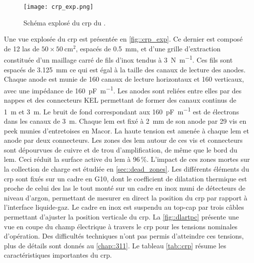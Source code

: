      \begin{figure}[htbp]
        \begin{center}\texttt{[image: crp\_exp.png]}\end{center}
        \caption[Schéma explosé du CRP du \TOO{}.]{\label{fig::crp_exp}Schéma explosé du \gls{crp} du \TOO{}.}
      \end{figure}

      Une vue explosée du \gls{crp} est présentée en \autoref{fig::crp_exp}. Ce dernier est composé de 12 \gls{las} de $50\times\SI{50}{\centi\meter\squared}$,  espacés de \SI{0.5}{\milli\meter}, et d'une grille d'extraction constituée d'un maillage carré de fils d'inox tendus à \SI{3}{\newton\per\meter}. Ces fils sont espacés de \SI{3.125}{\milli\meter} ce qui est égal à la taille des canaux de lecture des anodes. Chaque anode est munie de 160 canaux de lecture horizontaux et 160 verticaux, avec une impédance de \SI{160}{\pico\farad\per\meter}. Les anodes sont reliées entre elles par des nappes et des connecteurs KEL permettant de former des canaux continus de \SI{1}{\meter} et \SI{3}{\meter}. Le bruit de fond correspondant aux \SI{160}{\pico\farad\per\meter} est de  électrons dans les canaux de \SI{3}{\meter}\cite{Aimard2018}. Chaque \gls{lem} est fixé à \SI{2}{\milli\meter} de son anode par 29 vis en \gls{peek} munies d'entretoises en Macor. La haute tension est amenée à chaque \gls{lem} et anode par deux connecteurs. Les zones des \gls{lem} autour de ces vis et connecteurs sont dépourvues de cuivre et de trou d'amplification, de même que le bord du \gls{lem}. Ceci réduit la surface active du \gls{lem} à 96\,\%. L'impact de ces zones mortes sur la collection de charge est étudiée en \autoref{sec::dead_zones}. Les différents éléments du \gls{crp} sont fixés sur un cadre en G10, dont le coefficient de dilatation thermique est proche de celui des \gls{las} le tout monté sur un cadre en inox muni de détecteurs de niveau d'argon, permettant de mesurer en direct la position du \gls{crp} par rapport à l'interface liquide-gaz. Le cadre en inox est suspendu au top-cap par trois câbles permettant d'ajuster la position verticale du \gls{crp}. La \autoref{fig::dlartpc} présente une vue en coupe du champ électrique à travers le \gls{crp} pour les tensions nominales d'opération. Des difficultés techniques n'ont pas permis d'atteindre ces tensions, plus de détails sont donnés au \autoref{chap::311}. Le tableau \autoref{tab::crp} résume les caractéristiques importantes du \gls{crp}.

